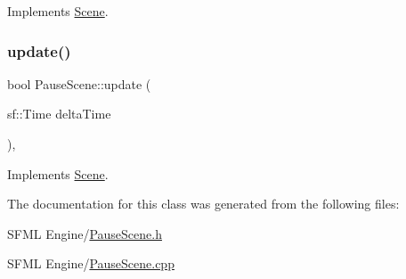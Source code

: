 Implements \hyperlink{class_scene_af25e4d2c998aca4e95899fb67488e815}{Scene}.

\mbox{\label{class_pause_scene_a8504260009b4dfb2380785e938e60b4b}} 
\subsubsection{\texorpdfstring{update()}{update()}}
{\footnotesize\ttfamily bool Pause\+Scene\+::update (\begin{DoxyParamCaption}\item[{sf\+::\+Time}]{delta\+Time }\end{DoxyParamCaption})\hspace{0.3cm}{\ttfamily [override]}, {\ttfamily [virtual]}}



Implements \hyperlink{class_scene_a72683c984a1da2ce4f757705e93730f2}{Scene}.



The documentation for this class was generated from the following files\+:\begin{DoxyCompactItemize}
\item 
S\+F\+M\+L Engine/\hyperlink{_pause_scene_8h}{Pause\+Scene.\+h}\item 
S\+F\+M\+L Engine/\hyperlink{_pause_scene_8cpp}{Pause\+Scene.\+cpp}\end{DoxyCompactItemize}

